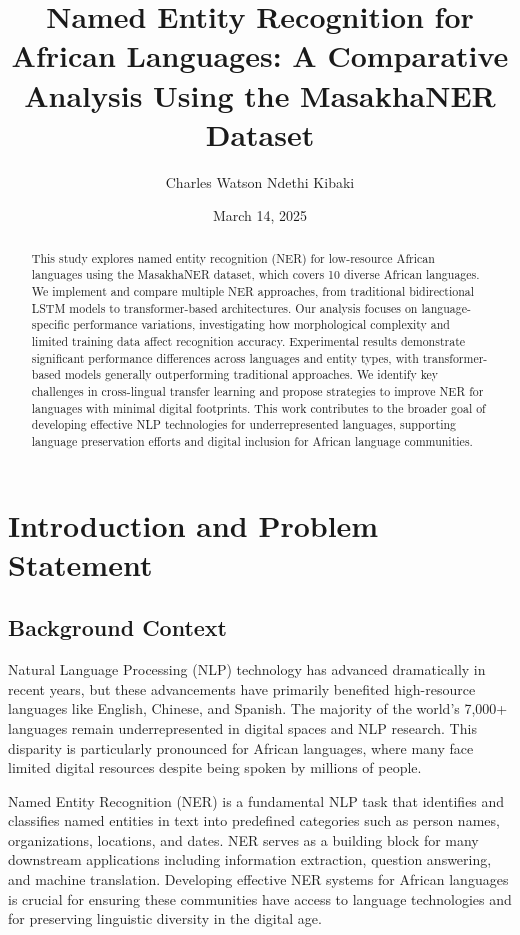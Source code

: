 \documentclass[
]{article}
\title{Named Entity Recognition for African Languages: A Comparative
Analysis Using the MasakhaNER Dataset}
\author{Charles Watson Ndethi Kibaki}
\date{March 14, 2025}
\begin{document}
\maketitle
\begin{abstract}
This study explores named entity recognition (NER) for low-resource
African languages using the MasakhaNER dataset, which covers 10 diverse
African languages. We implement and compare multiple NER approaches,
from traditional bidirectional LSTM models to transformer-based
architectures. Our analysis focuses on language-specific performance
variations, investigating how morphological complexity and limited
training data affect recognition accuracy. Experimental results
demonstrate significant performance differences across languages and
entity types, with transformer-based models generally outperforming
traditional approaches. We identify key challenges in cross-lingual
transfer learning and propose strategies to improve NER for languages
with minimal digital footprints. This work contributes to the broader
goal of developing effective NLP technologies for underrepresented
languages, supporting language preservation efforts and digital
inclusion for African language communities.
\end{abstract}


\section{Introduction and Problem
Statement}\label{introduction-and-problem-statement}

\subsection{Background Context}\label{background-context}

Natural Language Processing (NLP) technology has advanced dramatically
in recent years, but these advancements have primarily benefited
high-resource languages like English, Chinese, and Spanish. The majority
of the world's 7,000+ languages remain underrepresented in digital
spaces and NLP research. This disparity is particularly pronounced for
African languages, where many face limited digital resources despite
being spoken by millions of people.

Named Entity Recognition (NER) is a fundamental NLP task that identifies
and classifies named entities in text into predefined categories such as
person names, organizations, locations, and dates. NER serves as a
building block for many downstream applications including information
extraction, question answering, and machine translation. Developing
effective NER systems for African languages is crucial for ensuring
these communities have access to language technologies and for
preserving linguistic diversity in the digital age.
\end{document}
